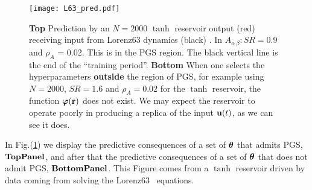 \documentclass[12pt]{article}
\begin{document}
\begin{figure}[!htpb]
\centering
\texttt{[image: L63\_pred.pdf]}
\caption{{\bf Top} Prediction by an $N = 2000$ $\tanh$ reservoir output (red) receiving input from Lorenz63 dynamics (black) \cite{lor63}. In $A_{\alpha\,\beta}:SR = 0.9$ and $\rho_{A}$ = 0.02.  This is in the PGS region.
    The black vertical line is the end of the ``training period''. {\bf Bottom} When one selects the hyperparameters {\bf outside} the region of PGS, for example using $N = 2000$, $SR = 1.6$ and $\rho_{A} = 0.02$ for the $\tanh$ reservoir, the function $\mbox{$\boldsymbol{\varphi}$}(\mbox{{\bf r}})$ does not exist. We may expect the reservoir to operate poorly in producing a replica of the input $\mbox{$\bf{u}$}(t)$, as we can see it does.}
    \label{xlor63tores}
\end{figure}

In Fig.(\ref{xlor63tores}) we display the predictive consequences of a set of $\mbox{$\boldsymbol{\theta}$}$ that admits PGS, ${\bf Top Panel}$, and after that the predictive consequences of a set of $\mbox{$\boldsymbol{\theta}$}$ that does not admit PGS, ${\bf Bottom Panel}$. This Figure comes from a $\tanh$ reservoir driven by data coming from solving the Lorenz63~\cite{lor63} equations.
\end{document}
